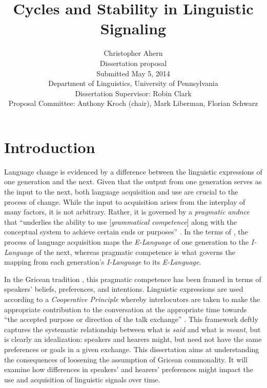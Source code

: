 \documentclass[12pt]{article}
\theoremstyle{definition} \newtheorem{definition}{Definition}
\begin{document}
\title{Cycles and Stability in Linguistic Signaling}
\author{Christopher Ahern \vspace{5mm} \\ 
Dissertation proposal\\ Submitted May 5, 2014\\
Department of Linguistics, University of Pennsylvania \vspace{5mm} \\
Dissertation Supervisor: Robin Clark\\
Proposal Committee: Anthony Kroch (chair), Mark Liberman, Florian Schwarz}
\date{}

\maketitle



\section{Introduction}

Language change is evidenced by a difference between the linguistic expressions of one generation and the next. Given that the output from one generation serves as the input to the next, both language acquisition and use are crucial to the process of change. While the input to acquisition arises from the interplay of many factors, it is not arbitrary. Rather, it is governed by a \emph{pragmatic andnce} that ``underlies the ability to use [\emph{grammatical competence}] along with the conceptual system to achieve certain ends or purposes'' \citep[59]{chomsky1980rules}. In the terms of \cite{chomsky1986knowledge}, the process of language acquisition maps the \emph{E-Language} of one generation to the \emph{I-Language} of the next, whereas pragmatic competence is what governs the mapping from each generation's \emph{I-Language} to its \emph{E-Language}.

In the Gricean tradition \citep{Grice:1975, Levinson:1983, Horn:1984}, this pragmatic competence has been framed in terms of speakers' beliefs, preferences, and intentions. Linguistic expressions are used according to a \emph{Cooperative Principle} whereby interlocutors are taken to make the appropriate contribution to the conversation at the appropriate time towards ``the accepted purpose or direction of the talk exchange'' \citep[26]{Grice:1975}. This framework deftly captures the systematic relationship between what is \emph{said} and what is \emph{meant}, but is clearly an idealization: speakers and hearers might, but need not have the same preferences or goals in a given exchange.   This dissertation aims at understanding the consequences of loosening the assumption of Gricean commonality. It will examine how differences in speakers' and hearers' preferences might impact the use and acquisition of linguistic signals over time. 
\end{document}
